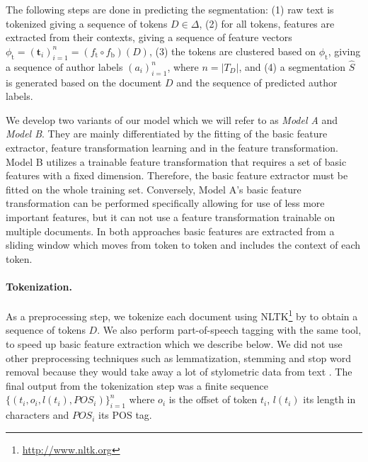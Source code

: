 \documentclass[10pt, a4paper]{article}
\newcommand{\vect}[1]{\bm{#1}}
\begin{document}
The following steps are done in predicting the segmentation: (1) raw text is tokenized giving a sequence of tokens $D\in\Delta$, (2) for all tokens, features are extracted from their contexts, giving a sequence of feature vectors $\phi_\mathrm{t} = (\vect{t}_i)_{i=1}^n = (f_\mathrm{t}\circ f_\mathrm{b})(D)$, (3) the tokens are clustered based on $\phi_\mathrm{t}$, giving a sequence of author labels $(a_i)_{i=1}^{n}$, where $n=|T_D|$, and (4) a segmentation $\hat{S}$ is generated based on the document $D$ and the sequence of predicted author labels.

We develop two variants of our model which we will refer to as \emph{Model A} and \emph{Model B}. They are mainly differentiated by the fitting of the basic feature extractor, feature transformation learning and in the feature transformation. Model B utilizes a trainable feature transformation that requires a set of basic features with a fixed dimension. Therefore, the basic feature extractor must be fitted on the whole training set. Conversely, Model A's basic feature transformation can be performed specifically allowing for use of less more important features, but it can not use a feature transformation trainable on multiple documents. In both approaches basic features are extracted from a sliding window which moves from token to token and includes the context of each token.

\paragraph{Tokenization.} As a preprocessing step, we tokenize each document using NLTK\footnote{\url{http://www.nltk.org}} by \citet{bird-2009} to obtain a sequence of tokens $D$. We also perform part-of-speech tagging with the same tool, to speed up basic feature extraction which we describe below. We did not use other preprocessing techniques such as lemmatization, stemming and stop word removal because they would take away a lot of stylometric data from text \cite{stamatatos-2009a}. The final output from the tokenization step was a finite sequence $\{(t_i, o_i, l(t_i), \mathit{POS}_i)\}_{i=1}^n$ where $o_i$ is the offset of token $t_i$, $l(t_i)$ its length in characters and $\mathit{POS}_i$ its POS tag.
\end{document}
